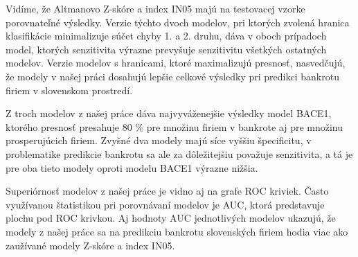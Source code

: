 Vidíme, že Altmanovo Z-skóre a index IN05 majú na testovacej vzorke porovnateľné výsledky.
Verzie týchto dvoch modelov, pri ktorých zvolená hranica klasifikácie minimalizuje súčet chyby 1. a 2. druhu, dáva v oboch prípadoch model, ktorých senzitivita výrazne prevyšuje senzitivitu všetkých ostatných modelov.
Verzie modelov s hranicami, ktoré maximalizujú presnosť, nasvedčujú, že modely v našej práci dosahujú lepšie celkové výsledky pri predikci bankrotu firiem v slovenskom prostredí.

Z troch modelov z našej práce dáva najvyváženejšie výsledky model BACE1, ktorého presnosť presahuje 80 \% pre množinu firiem v bankrote aj pre množinu prosperujúcich firiem.
Zvyšné dva modely majú síce vyššiu špecificitu, v problematike predikcie bankrotu sa ale za dôležitejšiu považuje senzitivita, a tá je pre oba tieto modely oproti modelu BACE1 výrazne nižšia.


Superiórnosť modelov z našej práce je vidno aj na grafe ROC kriviek.
Často využívanou štatistikou pri porovnávaní modelov je AUC, ktorá predstavuje plochu pod ROC krivkou.
Aj hodnoty AUC jednotlivých modelov ukazujú, že modely z našej práce sa na predikciu bankrotu slovenských firiem hodia viac ako zaužívané modely Z-skóre a index IN05.